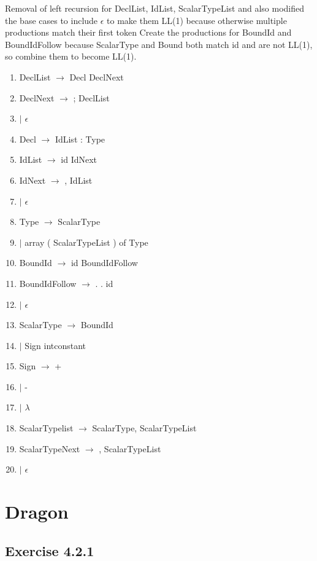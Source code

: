 \documentclass[letterpaper, 10pt, DIV=13]{scrartcl}
\numberwithin{equation}{section}
\numberwithin{figure}{section}
\numberwithin{table}{section}
\begin{document}
Removal of left recursion for DeclList, IdList, ScalarTypeList and also
modified the base cases to include $\epsilon$ to make them LL(1) because
otherwise multiple productions match their first token Create the productions
for BoundId and BoundIdFollow because ScalarType and Bound both match id and
are not LL(1), so combine them to become LL(1).
\begin{enumerate}
    \item DeclList $\rightarrow$ Decl DeclNext
    \item DeclNext $\rightarrow$ ; DeclList
    \item $\mid$ $\epsilon$
    \item Decl $\rightarrow$ IdList : Type
    \item IdList $\rightarrow$ id IdNext
    \item IdNext $\rightarrow$ , IdList
    \item $\mid$ $\epsilon$
    \item Type $\rightarrow$ ScalarType
    \item $\mid$ array ( ScalarTypeList ) of Type
    \item BoundId $\rightarrow$ id BoundIdFollow
    \item BoundIdFollow $\rightarrow$ . . id
    \item $\mid$ $\epsilon$
    \item ScalarType $\rightarrow$ BoundId
    \item $\mid$ Sign intconstant
    \item Sign $\rightarrow$ +
    \item $\mid$ - 
    \item $\mid$ $\lambda$ 
    \item ScalarTypelist $\rightarrow$ ScalarType, ScalarTypeList
    \item ScalarTypeNext $\rightarrow$ , ScalarTypeList
    \item $\mid$ $\epsilon$
\end{enumerate}

\section{Dragon}
\subsection{Exercise 4.2.1}
\end{document}
